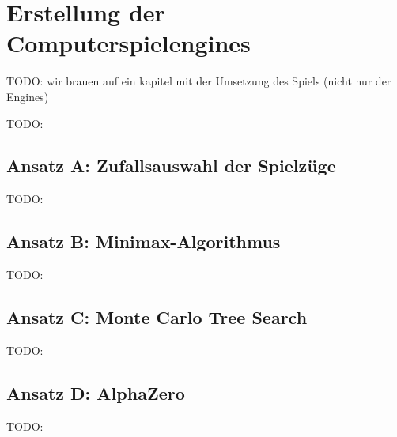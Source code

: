 \chapter{Erstellung der Computerspielengines}
\label{chapter:erstellung-der-computerspielengines}

TODO: wir brauen auf ein kapitel mit der Umsetzung des Spiels (nicht nur der Engines)

TODO:

\section{Ansatz A: Zufallsauswahl der Spielzüge}
\label{chapter:ansatz-a}

TODO:

\section{Ansatz B: Minimax-Algorithmus}
\label{chapter:ansatz-b}

TODO:

\section{Ansatz C: Monte Carlo Tree Search}
\label{chapter:ansatz-c}

TODO:

\section{Ansatz D: AlphaZero}
\label{chapter:ansatz-d}

TODO:
